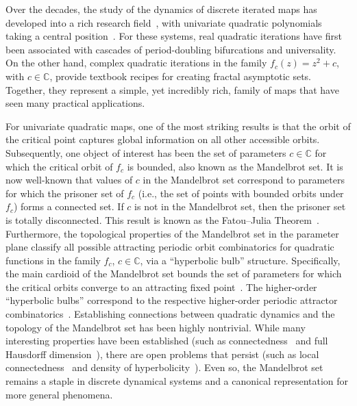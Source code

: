 \documentclass[10pt]{article}
\begin{document}
Over the decades, the study of the dynamics of discrete iterated maps has developed into a rich research field~\cite{carleson1996complex}, with univariate quadratic polynomials taking a central position~\cite{mcmullen1994complex}. For these systems, real quadratic iterations have first been associated with cascades of period-doubling bifurcations and universality. On the other hand, complex quadratic iterations in the family $f_c(z) = z^2 + c$, with $c \in \mathbb{C}$, provide textbook recipes for creating fractal asymptotic sets. Together, they represent a simple, yet incredibly rich, family of maps that have seen many practical applications.

For univariate quadratic maps, one of the most striking results is that the orbit of the critical point captures global information on all other accessible orbits. Subsequently, one object of interest has been the set of parameters $c \in \mathbb{C}$ for which the critical orbit of $f_c$ is bounded, also known as the Mandelbrot set. It is now well-known that values of $c$ in the Mandelbrot set correspond to parameters for which the prisoner set of $f_c$ (i.e., the set of points with bounded orbits under $f_c$) forms a connected set. If $c$ is not in the Mandelbrot set, then the prisoner set is totally disconnected. This result is known as the Fatou--Julia Theorem~\cite{milnor2006dynamics}. Furthermore, the topological properties of the Mandelbrot set in the parameter plane classify all possible attracting periodic orbit combinatorics for quadratic functions in the family $f_c$, $c\in \mathbb{C}$, via a ``hyperbolic bulb'' structure. Specifically, the main cardioid of the Mandelbrot set bounds the set of parameters for which the critical  orbits converge to an attracting fixed point~\cite{brucks2004topics}. The higher-order ``hyperbolic bulbs'' correspond to the respective higher-order periodic attractor combinatorics~\cite{ivancevic2007high}.
Establishing  connections between quadratic dynamics and the topology of the Mandelbrot set has been highly nontrivial.
While many interesting properties have been established (such as connectedness~\cite{douady1984etude,douady1985dynamics} and full Hausdorff dimension~\cite{shishikura1998hausdorff}), there are open problems that persist (such as local connectedness~\cite{hubbard1992local} and density of hyperbolicity~\cite{douady1984exploring,jung2002homeomorphisms}). Even so, the Mandelbrot set remains a staple in discrete dynamical systems and a canonical representation for more general phenomena.
\end{document}
